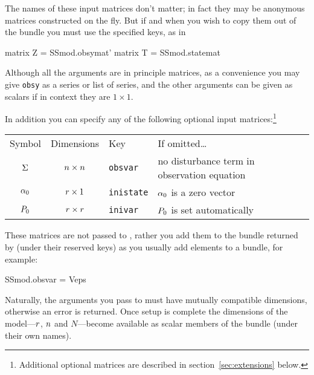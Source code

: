 
The names of these input matrices don't matter; in fact they may be
anonymous matrices constructed on the fly. But if and when you wish to
copy them out of the bundle you must use the specified keys, as in
\begin{code}
matrix Z = SSmod.obsymat'
matrix T = SSmod.statemat
\end{code}

Although all the arguments are in principle matrices, as a convenience
you may give \texttt{obsy} as a series or list of series, and the
other arguments can be given as scalars if in context they are
$1 \times 1$.

In addition you can specify any of the following optional input
matrices:\footnote{Additional optional matrices are described in
section~\ref{sec:extensions} below.}

\begin{center}
  \begin{tabular}{ccll}
Symbol & Dimensions & Key & If omitted\dots \\[6pt]
$\Sigma$ & $n \times n$ & \texttt{obsvar} &
 no disturbance term in observation equation \\
$\alpha_0$ & $r \times 1$ & \texttt{inistate} &
 $\alpha_0$ is a zero vector\\
$P_0$ & $r \times r$ & \texttt{inivar} &
 $P_0$ is set automatically
\end{tabular}
\end{center}

These matrices are not passed to , rather you add them to
the bundle returned by  (under their reserved keys) as you
usually add elements to a bundle, for example:
\begin{code}
SSmod.obsvar = Veps
\end{code}

Naturally, the arguments you pass to  must have mutually
compatible dimensions, otherwise an error is returned. Once setup is
complete the dimensions of the model---$r$, $n$ and
$N$---become available as scalar members of the bundle (under their
own names).

